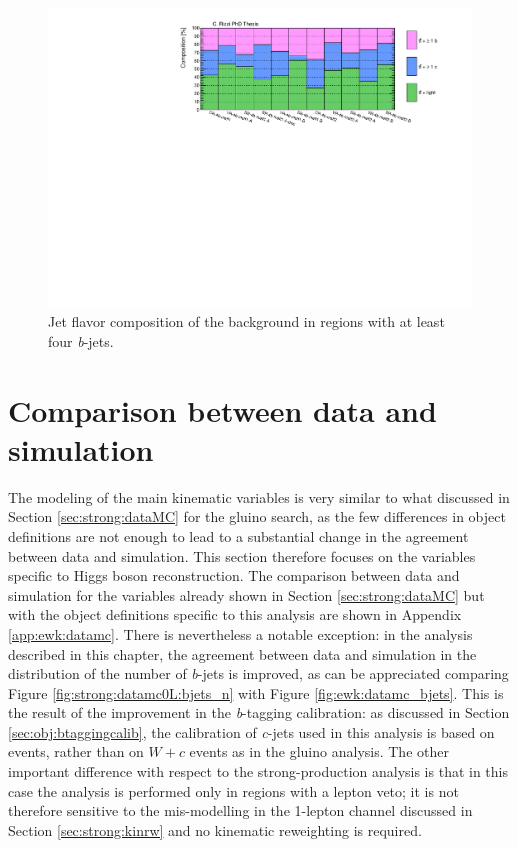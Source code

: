 \begin{figure}[htbp]
\includegraphics[width=\textwidth]{figures/ewk_prod/comp_plots/hh_4b_HF.pdf}
\caption{Jet flavor composition of the \ttbar background in regions with at least four \textit{b}-jets.}
	\label{fig:HFcomp_hh4b}
\end{figure}

\FloatBarrier

\section{Comparison between data and simulation}
\label{sec:ewk:dataMC}

The modeling of the main kinematic variables is very similar to what discussed in Section \ref{sec:strong:dataMC} 
for the gluino search, as the few differences in object definitions are not enough to 
lead to a substantial change in the agreement between data and simulation. 
This section therefore focuses on the variables specific to Higgs boson reconstruction.
The comparison between data and simulation for the variables already shown in Section \ref{sec:strong:dataMC} but with the object definitions 
specific to this analysis are shown in Appendix \ref{app:ewk:datamc}.
There is nevertheless a notable exception: in the analysis described in this chapter, the agreement between data and simulation in the 
distribution of the number of \textit{b}-jets is improved, as can be appreciated comparing Figure \ref{fig:strong:datamc0L:bjets_n} with Figure \ref{fig:ewk:datamc_bjets}.
This is the result of the improvement in the \textit{b}-tagging calibration: as discussed in Section \ref{sec:obj:btaggingcalib}, 
the calibration of \textit{c}-jets used in this analysis is based on \ttbar events, rather than on $W+c$ events as in the gluino analysis.
The other important difference with respect to the strong-production analysis is that in this case the analysis is performed 
only in regions with a lepton veto; it is not therefore sensitive to the mis-modelling in the 1-lepton channel discussed in Section 
\ref{sec:strong:kinrw} and no kinematic reweighting is required. 

